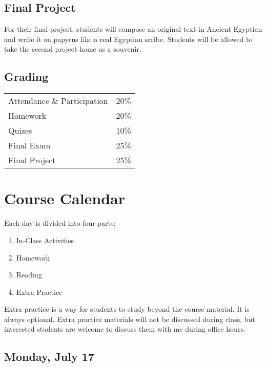 \documentclass[11pt]{article}
\begin{document}
		\subsection*{Final Project}
			For their final project, students will compose an original text in Ancient Egyptian
			 and write it on papyrus like a real Egyptian scribe. 
			Students will be allowed to take the second project home as a souvenir.
			
			
		\subsection*{Grading}
			\begin{tabular}{l l}
				Attendance \& Participation & 20\% \\
				Homework & 20\% \\
				Quizes & 10\% \\
				Final Exam & 25\% \\
				Final Project & 25\% \\
			\end{tabular}
	
	\section*{Course Calendar}
	
	Each day is divided into four parts: 
	\begin{enumerate}
	\item In-Class Activities
	\item Homework
	\item Reading
	\item Extra Practice
	\end{enumerate}
	
	Extra practice is a way for students to study beyond the course material.
	It is always optional.
	Extra practice materials will not be discussed during class, but interested students are welcome to discuss them with me during office hours.
	
	\subsection*{Monday, July 17}
\end{document}
